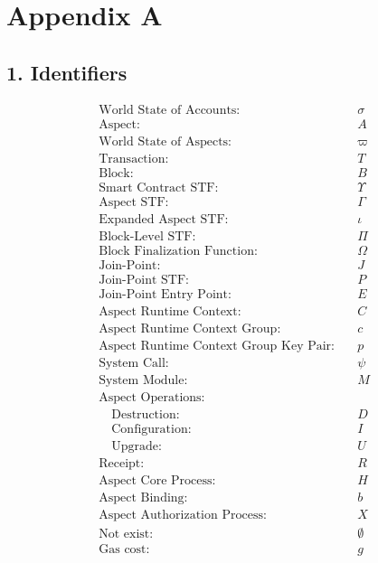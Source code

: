 \section*{Appendix A}

\subsection*{1. Identifiers}
\begin{align*}
\text{World State of Accounts:} & \quad \sigma \\
\text{Aspect:} & \quad A \\
\text{World State of Aspects:} & \quad \varpi \\
\text{Transaction:} & \quad T \\
\text{Block:} & \quad B \\
\text{Smart Contract STF:} & \quad \Upsilon \\
\text{Aspect STF:} & \quad \Gamma \\
    \text{Expanded Aspect STF:} & \quad \iota \\
\text{Block-Level STF:} & \quad \Pi \\
\text{Block Finalization Function:} & \quad \Omega \\
\text{Join-Point:} & \quad J \\
\text{Join-Point STF:} & \quad P \\
\text{Join-Point Entry Point:} & \quad E \\
\text{Aspect Runtime Context:} & \quad C \\
    \text{Aspect Runtime Context Group:} & \quad c \\
    \text{Aspect Runtime Context Group Key Pair:} & \quad p \\
\text{System Call:} & \quad \psi \\
\text{System Module:} & \quad M \\
\text{Aspect Operations:} & \\
    \quad \text{Destruction:} & \quad D \\
    \quad \text{Configuration:} & \quad I \\
    \quad \text{Upgrade:} & \quad U \\
\text{Receipt:} & \quad R \\
\text{Aspect Core Process:} & \quad H \\
\text{Aspect Binding:} & \quad b \\
\text{Aspect Authorization Process:} & \quad X \\
\text{Not exist:} & \quad \emptyset \\
\text{Gas cost:} & \quad g \\
\end{align*}


